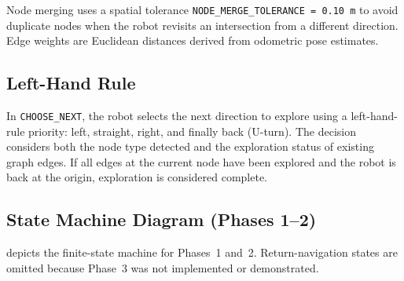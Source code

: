 \documentclass[runningheads]{llncs}
\begin{document}
Node merging uses a spatial tolerance \texttt{NODE\_MERGE\_TOLERANCE = 0.10\,m} to avoid duplicate nodes when the robot revisits an intersection from a different direction. Edge weights are Euclidean distances derived from odometric pose estimates.

\subsection{Left-Hand Rule}

In \texttt{CHOOSE\_NEXT}, the robot selects the next direction to explore using a left-hand-rule priority: left, straight, right, and finally back (U-turn). The decision considers both the node type detected and the exploration status of existing graph edges. If all edges at the current node have been explored and the robot is back at the origin, exploration is considered complete.

\subsection{State Machine Diagram (Phases 1--2)}

 depicts the finite-state machine for Phases~1 and~2. Return-navigation states are omitted because Phase~3 was not implemented or demonstrated.
\end{document}
